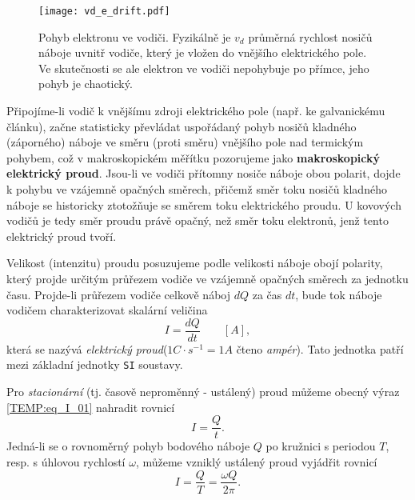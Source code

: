 {      \begin{figure}
        \centering
        \texttt{[image: vd\_e\_drift.pdf]}
        \caption[Pohyb elektronu ve vodiči.]{Pohyb elektronu ve vodiči. Fyzikálně je $v_d$ 
                 průměrná rychlost nosičů náboje uvnitř vodiče, který je vložen do vnějšího
                 elektrického pole. Ve skutečnosti se ale elektron ve vodiči nepohybuje po přímce,
                 jeho pohyb je chaotický.}
        \label{TEMP:fig_vd_e_drift}
      \end{figure}
      
      Připojíme-li vodič k vnějšímu zdroji elektrického pole (např. ke galvanickému článku), začne
      statisticky převládat uspořádaný pohyb nosičů kladného (záporného) náboje ve směru (proti
      směru) vnějšího pole nad termickým pohybem, což v makroskopickém měřít\-ku pozorujeme jako
      \textbf{makroskopický elektrický proud}. Jsou-li ve vodiči přítomny nosiče náboje obou
      polarit, dojde k pohybu ve vzájemně opačných směrech, přičemž směr toku nosičů kladného
      náboje se historicky ztotožňuje se směrem toku elektrického proudu. U kovových vodičů je tedy
      směr proudu právě opačný, než směr toku elektronů, jenž tento elektrický proud tvoří.
      
      Velikost (intenzitu) proudu posuzujeme podle velikosti náboje obojí polarity, který projde
      určitým průřezem vodiče ve vzájemně opačných směrech za jednotku času. Projde-li průřezem
      vodiče celkově náboj $dQ$ za čas $dt$, bude tok náboje vodičem charakterizovat skalární
      veličina
        \begin{equation}\label{TEMP:eq_I_01}
          I = \frac{dQ}{dt} \qquad[A],  
        \end{equation}        
      která se nazývá \emph{elektrický proud}($1C\cdot s^{-1} = 1A $ čteno \emph{ampér}). Tato
      jednotka patří mezi základní jednotky \texttt{SI} soustavy.
      
      Pro \emph{stacionární} (tj. časově neproměnný - ustálený) proud můžeme obecný výraz
      \ref{TEMP:eq_I_01} nahradit rovnicí
        \begin{equation}\label{TEMP:eq_I_02}
          I = \frac{Q}{t}.  
        \end{equation}       
      Jedná-li se o rovnoměrný pohyb bodového náboje $Q$ po kružnici s periodou $T$, resp. s
      úhlovou rychlostí $\omega$, můžeme vzniklý ustálený proud vyjádřit rovnicí 
        \begin{equation}\label{TEMP:eq_I_03}
          I = \frac{Q}{T} = \frac{\omega Q}{2\pi}.  
        \end{equation}
      
}
